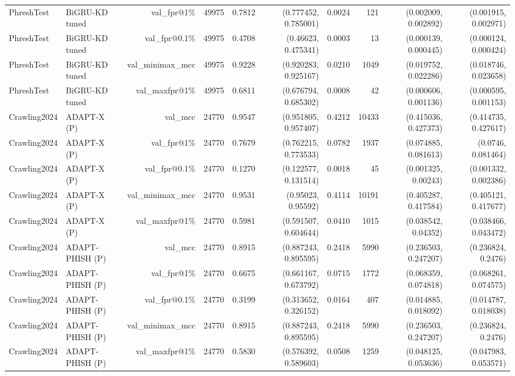 \begin{table}[t]
\begin{tabular}{llrrrrrrrr}
PhreshTest & BiGRU-KD tuned & val\_fpr@1\% & 49975 & 0.7812 & (0.777452, 0.785001) & 0.0024 & 121 & (0.002009, 0.002892) & (0.001915, 0.002971) \\
PhreshTest & BiGRU-KD tuned & val\_fpr@0.1\% & 49975 & 0.4708 & (0.46623, 0.475341) & 0.0003 & 13 & (0.000139, 0.000445) & (0.000124, 0.000424) \\
PhreshTest & BiGRU-KD tuned & val\_minimax\_mcc & 49975 & 0.9228 & (0.920283, 0.925167) & 0.0210 & 1049 & (0.019752, 0.022286) & (0.018746, 0.023658) \\
PhreshTest & BiGRU-KD tuned & val\_maxfpr@1\% & 49975 & 0.6811 & (0.676794, 0.685302) & 0.0008 & 42 & (0.000606, 0.001136) & (0.000595, 0.001153) \\
Crawling2024 & ADAPT-X (P) & val\_mcc & 24770 & 0.9547 & (0.951805, 0.957407) & 0.4212 & 10433 & (0.415036, 0.427373) & (0.414735, 0.427617) \\
Crawling2024 & ADAPT-X (P) & val\_fpr@1\% & 24770 & 0.7679 & (0.762215, 0.773533) & 0.0782 & 1937 & (0.074885, 0.081613) & (0.0746, 0.081464) \\
Crawling2024 & ADAPT-X (P) & val\_fpr@0.1\% & 24770 & 0.1270 & (0.122577, 0.131514) & 0.0018 & 45 & (0.001325, 0.00243) & (0.001332, 0.002386) \\
Crawling2024 & ADAPT-X (P) & val\_minimax\_mcc & 24770 & 0.9531 & (0.95023, 0.95592) & 0.4114 & 10191 & (0.405287, 0.417584) & (0.405121, 0.417677) \\
Crawling2024 & ADAPT-X (P) & val\_maxfpr@1\% & 24770 & 0.5981 & (0.591507, 0.604644) & 0.0410 & 1015 & (0.038542, 0.04352) & (0.038466, 0.043472) \\
Crawling2024 & ADAPT-PHISH (P) & val\_mcc & 24770 & 0.8915 & (0.887243, 0.895595) & 0.2418 & 5990 & (0.236503, 0.247207) & (0.236824, 0.2476) \\
Crawling2024 & ADAPT-PHISH (P) & val\_fpr@1\% & 24770 & 0.6675 & (0.661167, 0.673792) & 0.0715 & 1772 & (0.068359, 0.074818) & (0.068261, 0.074575) \\
Crawling2024 & ADAPT-PHISH (P) & val\_fpr@0.1\% & 24770 & 0.3199 & (0.313652, 0.326152) & 0.0164 & 407 & (0.014885, 0.018092) & (0.014787, 0.018038) \\
Crawling2024 & ADAPT-PHISH (P) & val\_minimax\_mcc & 24770 & 0.8915 & (0.887243, 0.895595) & 0.2418 & 5990 & (0.236503, 0.247207) & (0.236824, 0.2476) \\
Crawling2024 & ADAPT-PHISH (P) & val\_maxfpr@1\% & 24770 & 0.5830 & (0.576392, 0.589603) & 0.0508 & 1259 & (0.048125, 0.053636) & (0.047983, 0.053571) \\

\end{tabular}
\end{table}
